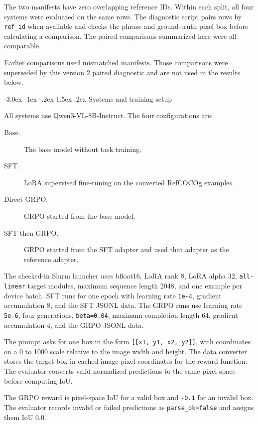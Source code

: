 \documentclass[11pt]{article}
\makeatletter
\renewcommand{\section}{\@startsection{section}{1}{\z@}%
  {-3.0ex \@plus -1ex \@minus -.2ex}%
  {1.5ex \@plus .2ex}%
  {\normalfont\normalsize\bfseries}}
\makeatother
\begin{document}
The two manifests have zero overlapping reference IDs. Within each split, all
four systems were evaluated on the same rows. The diagnostic script pairs rows
by \texttt{ref\_id} when available and checks the phrase and ground-truth pixel
box before calculating a comparison. The paired comparisons summarized here
were all comparable.

Earlier comparisons used mismatched manifests. Those comparisons were
superseded by this version 2 paired diagnostic and are not used in the results
below.

\section{Systems and training setup}

All systems use Qwen3-VL-8B-Instruct. The four configurations are:

\begin{description}
  \item[Base.] The base model without task training.
  \item[SFT.] LoRA supervised fine-tuning on the converted RefCOCOg examples.
  \item[Direct GRPO.] GRPO started from the base model.
  \item[SFT then GRPO.] GRPO started from the SFT adapter and used that adapter
  as the reference adapter.
\end{description}

The checked-in Slurm launcher uses bfloat16, LoRA rank 8, LoRA alpha 32,
\texttt{all-linear} target modules, maximum sequence length 2048, and one
example per device batch. SFT runs for one epoch with learning rate
\texttt{1e-4}, gradient accumulation 8, and the SFT JSONL data. The GRPO runs
use learning rate \texttt{5e-6}, four generations, \texttt{beta=0.04}, maximum
completion length 64, gradient accumulation 4, and the GRPO JSONL data.

The prompt asks for one box in the form
\texttt{[[x1, y1, x2, y2]]}, with coordinates on a 0 to 1000 scale relative
to the image width and height. The data converter stores the target box in
cached-image pixel coordinates for the reward function. The evaluator converts
valid normalized predictions to the same pixel space before computing IoU.

The GRPO reward is pixel-space IoU for a valid box and \texttt{-0.1} for an
invalid box. The evaluator records invalid or failed predictions as
\texttt{parse\_ok=false} and assigns them IoU 0.0.
\end{document}
